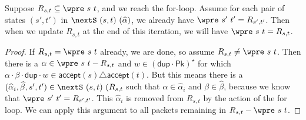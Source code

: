 \documentclass[acmsmall,dvipsnames,nonacm]{acmart}
\makeatletter
\newcommand{\mminline}[1]{\todo[inline,color=pink,caption={}]{\footnotesize MM\@: #1}}
\newcommand\Pk{\mathsf{Pk}}
\newcommand\sympk{\widehat\alpha}
\newcommand\sympkp{\widehat\beta}
\newcommand\pk{\alpha}
\newcommand\pkp{\beta}
\newcommand\dup{\mathsf{dup}}
\newcommand\ddd{\cdot\dup\cdot}
\newcommand\accept{\mathsf{accept}}
\makeatother
\begin{document}
\begin{lemma}\label{lem:one-step}
Suppose $R_{s,t} \subseteq \wpre\ s\ t$, and we reach the for-loop. Assume for
each pair of states $(s',t')$ in $\nextS\ (s,t)\ (\sympk)$, we already have
$\wpre\ s'\ t' = R_{s',t'}$. Then when we update $R_{s,t}$ at the end of this
iteration, we will have $\wpre\ s\ t = R_{s,t}$.
\end{lemma}
\begin{proof}
If $R_{s,t} = \wpre\ s\ t$ already, we are done, so assume $R_{s,t}\neq\wpre\ s\
t$. Then there is a $\pk \in \wpre\ s\ t - R_{s,t}$ and $w\in
(\dup\cdot\Pk)^\star$ for which $\pk\cdot \pkp \ddd w \in \accept(s)
\triangle \accept (t)$.  But this means there is a $(\sympk_i, \sympkp, s',t') \in
\nextS\ (s,t)\ (R_{s,t}$ such that $\pk\in\sympk_i$ and $\pkp\in\sympkp$,
because we know that $\wpre\ s'\ t' = R_{s',t'}$.
This $\sympk_i$ is removed from $R_{s,t}$ by the action of the for loop. We can
apply this argument to all packets remaining in $R_{s,t} - \wpre\ s\ t$.
\end{proof}

\end{document}
